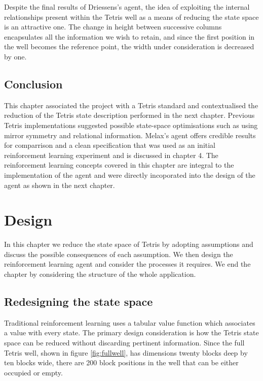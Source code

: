 \documentclass{rucsthesis}
\begin{document}
Despite the final results of Driessens's agent, the idea of exploiting the internal relationships present within the Tetris well as a means of reducing the state space is an attractive one. The change in height between successive columns encapsulates all the information we wish to retain, and since the first position in the well becomes the reference point, the width under consideration is decreased by one.

\section{Conclusion}

This chapter associated the project with a Tetris standard and contextualised the reduction of the Tetris state description performed in the next chapter. Previous Tetris implementations suggested possible state-space optimisations such as using mirror symmetry and relational information. Melax's agent offers credible results for comparrison and a clean specification that was used as an initial reinforcement learning experiment and is discussed in chapter 4. The reinforcement learning concepts covered in this chapter are integral to the implementation of the agent and were directly incoporated into the design of the agent as shown in the next chapter.

\chapter{Design}

In this chapter we reduce the state space of Tetris by adopting assumptions and discuss the possible consequences of each assumption. We then design the reinforcement learning agent and consider the processes it requires. We end the chapter by considering the structure of the whole application.

\section{Redesigning the state space}

Traditional reinforcement learning uses a tabular value function which associates a value with every state. The primary design consideration is how the Tetris state space can be reduced without discarding pertinent information. Since the full Tetris well, shown in figure \ref{fig:fullwell}, has dimensions twenty blocks deep by ten blocks wide, there are 200 block positions in the well that can be either occupied or empty.
\end{document}
